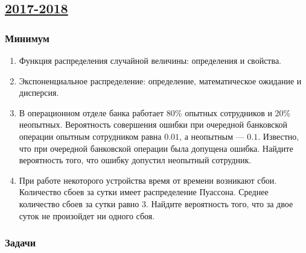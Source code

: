 \subsection[2017-2018]{\hyperref[sec:sol_kr_01_2017_2018]{2017-2018}}
\label{sec:kr_01_2017_2018} %

\subsubsection*{Минимум}

\begin{enumerate}
\item Функция распределения случайной величины: определения и свойства.
\item Экспоненциальное распределение: определение, математическое ожидание и дисперсия.
\item В операционном отделе банка работает 80\% опытных сотрудников и 20\% неопытных. Вероятность совершения ошибки при очередной банковской операции опытным сотрудником равна $0.01$, а неопытным — $0.1$. Известно, что при очередной банковской операции была допущена ошибка. Найдите вероятность того, что ошибку допустил неопытный сотрудник.
\item При работе некоторого устройства время от времени возникают сбои. Количество сбоев за сутки имеет распределение Пуассона. Среднее количество сбоев за сутки равно 3. Найдите вероятность того, что за двое суток не произойдет ни одного сбоя.

\end{enumerate}

\subsubsection*{Задачи}

